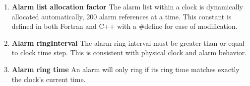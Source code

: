
\begin{enumerate}

\item {\bf Alarm list allocation factor}  The alarm list within a clock is
dynamically allocated automatically, 200 alarm references at a time.
This constant is defined in both Fortran and C++ with a \#define for ease
of modification.

\item {\bf Alarm ringInterval } The alarm ring interval must be greater
than or equal to clock time step. This is consistent with physical clock and
alarm behavior.

\item {\bf Alarm ring time} An alarm will only ring if its ring time matches
exactly the clock's current time.

\end{enumerate}

